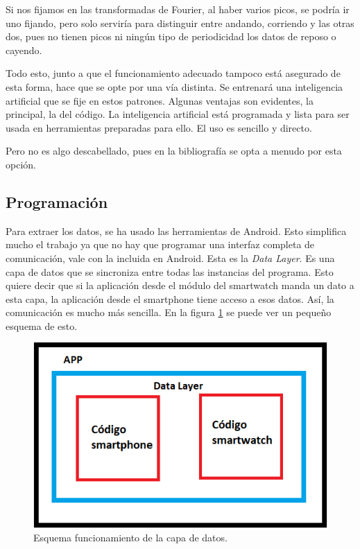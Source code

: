 \documentclass[12pt]{article}
\numberwithin{equation}{section}
\begin{document}
Si nos fijamos en las transformadas de Fourier, al haber varios picos,  se podría ir uno fijando, pero solo serviría para distinguir entre andando, corriendo y las otras dos, pues no tienen picos ni ningún tipo de periodicidad los datos de reposo o cayendo. 

Todo esto, junto a que el funcionamiento adecuado tampoco está asegurado de esta forma, hace que se opte por una vía distinta. Se entrenará una inteligencia artificial que se fije en estos patrones. Algunas ventajas son evidentes, la principal, la del código. La inteligencia artificial está programada y lista para ser usada en herramientas preparadas para ello. El uso es sencillo y directo.

Pero no es algo descabellado, pues en la bibliografía\cite{s150818901} se opta a menudo por esta opción.


\newpage

\newpage
\subsection{Programación}

Para extraer los datos, se ha usado las herramientas de Android. Esto simplifica mucho el trabajo ya que no hay que programar una interfaz completa de comunicación, vale con la incluida en Android. Esta es la \textit{Data Layer}. Es una capa de datos que se sincroniza entre todas las instancias del programa. Esto quiere decir que si la aplicación desde el módulo del smartwatch manda un dato a esta capa, la aplicación desde el smartphone tiene acceso a esos datos. Así, la comunicación es mucho más sencilla. En la figura \ref{fig:datalayer} se puede ver un pequeño esquema de esto.

\begin{figure}[h]
    \centering
    \includegraphics[width=1\textwidth]{esquemacodigo.png}
    \caption{Esquema funcionamiento de la capa de datos.}
    \label{fig:datalayer}
\end{figure}
\end{document}
